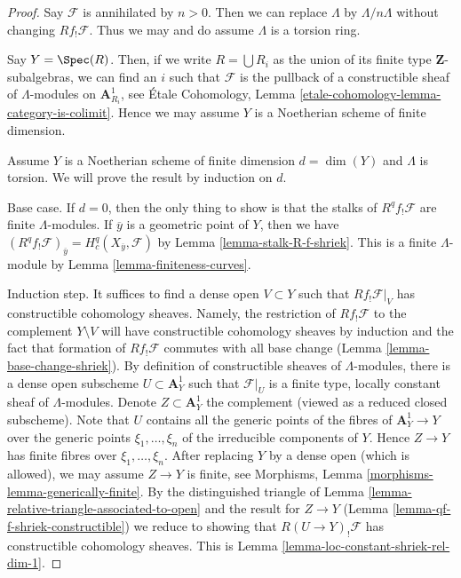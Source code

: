 \begin{proof}
Say $\mathcal{F}$ is annihilated by $n > 0$. Then we can replace
$\Lambda$ by $\Lambda/n\Lambda$ without changing $Rf_!\mathcal{F}$.
Thus we may and do assume $\Lambda$ is a torsion ring.

\medskip\noindent
Say $Y = \Spec(R)$. Then, if we write
$R = \bigcup R_i$ as the union of its finite type $\mathbf{Z}$-subalgebras,
we can find an $i$ such that $\mathcal{F}$ is the pullback of
a constructible sheaf of $\Lambda$-modules on $\mathbf{A}^1_{R_i}$, see
\'Etale Cohomology, Lemma \ref{etale-cohomology-lemma-category-is-colimit}.
Hence we may assume $Y$ is a Noetherian scheme of finite dimension.

\medskip\noindent
Assume $Y$ is a Noetherian scheme of finite dimension $d = \dim(Y)$
and $\Lambda$ is torsion. We will prove the result by induction on $d$.

\medskip\noindent
Base case. If $d = 0$, then the only thing to show is that the stalks
of $R^qf_!\mathcal{F}$ are finite $\Lambda$-modules.
If $\overline{y}$ is a geometric point of $Y$, then we have
$(R^qf_!\mathcal{F})_{\overline{y}} = H^q_c(X_{\overline{y}}, \mathcal{F})$
by Lemma \ref{lemma-stalk-R-f-shriek}.
This is a finite $\Lambda$-module by Lemma \ref{lemma-finiteness-curves}.

\medskip\noindent
Induction step. It suffices to find a dense open $V \subset Y$ such
that $Rf_!\mathcal{F}|_V$ has constructible cohomology sheaves. Namely, the
restriction of $Rf_!\mathcal{F}$ to the complement $Y \setminus V$
will have constructible cohomology sheaves by induction
and the fact that formation of $Rf_!\mathcal{F}$ commutes
with all base change (Lemma \ref{lemma-base-change-shriek}).
By definition of constructible sheaves of $\Lambda$-modules, there is a dense
open subscheme $U \subset \mathbf{A}^1_Y$ such that $\mathcal{F}|_U$
is a finite type, locally constant sheaf of $\Lambda$-modules.
Denote $Z \subset \mathbf{A}^1_Y$ the complement (viewed as a reduced
closed subscheme). Note that $U$ contains all the generic points of the
fibres of $\mathbf{A}^1_Y \to Y$ over the generic points
$\xi_1, \ldots, \xi_n$ of the irreducible components of $Y$.
Hence $Z \to Y$ has finite fibres over $\xi_1, \ldots, \xi_n$.
After replacing $Y$ by a dense open (which is allowed), we may
assume $Z \to Y$ is finite, see
Morphisms, Lemma \ref{morphisms-lemma-generically-finite}.
By the distinguished triangle of
Lemma \ref{lemma-relative-triangle-associated-to-open}
and the result for $Z \to Y$ (Lemma \ref{lemma-qf-f-shriek-constructible})
we reduce to showing that
$R(U \to Y)_!\mathcal{F}$ has constructible cohomology sheaves.
This is Lemma \ref{lemma-loc-constant-shriek-rel-dim-1}.
\end{proof}

